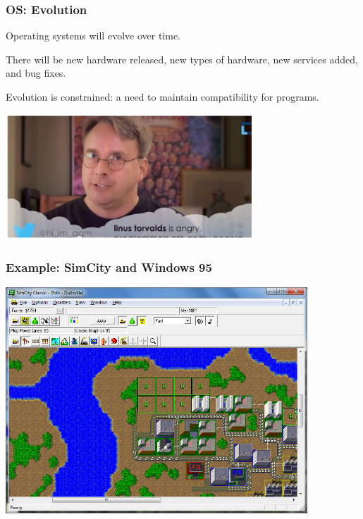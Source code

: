 \begin{frame}
\frametitle{OS: Evolution}
Operating systems will evolve over time. 

There will be new hardware released, new types of hardware, new services added, and bug fixes. 

Evolution is constrained: a need to maintain compatibility for programs. 

\begin{center}
	\includegraphics[width=0.7\textwidth]{images/linus-angry.jpg}
\end{center}

\end{frame}


\begin{frame}
\frametitle{Example: SimCity and Windows 95}

\begin{center}
	\includegraphics[width=0.85\textwidth]{images/simcity.png}
\end{center}

\end{frame}


